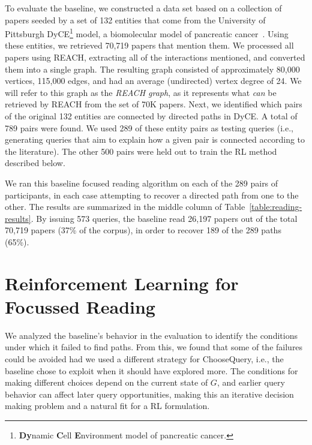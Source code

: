

To evaluate the baseline, we constructed a data set based on a collection of papers seeded by a set of 132 entities that come from the University of Pittsburgh DyCE\footnote{{\bf Dy}namic {\bf C}ell {\bf E}nvironment model of pancreatic cancer.} model, a biomolecular model of pancreatic cancer~\cite{dyce-inprep}.  Using these entities, we retrieved 70,719 papers that mention them.  We processed all papers using REACH, extracting all of the interactions mentioned, and converted them into a single graph.
The resulting graph consisted of approximately 80,000 vertices, 115,000 edges, and had an average (undirected) vertex degree of 24.  We will refer to this graph as the {\em REACH graph}, as it represents what {\em can} be retrieved by REACH from the set of 70K papers.  Next, we identified which pairs of the original 132 entities are connected by directed paths in DyCE.  A total of 789 pairs were found.  We used 289 of these entity pairs as testing queries (i.e., generating queries that aim to explain how a given pair is connected according to the literature). The other 500 pairs were held out to train the RL method described below.

We ran this baseline focused reading algorithm on each of the 289 pairs of participants, in each case attempting to recover a directed path from one to the other.  The results are summarized in the middle column of Table~\ref{table:reading-results}.  By issuing 573 queries, the baseline read 26,197 papers out of the total 70,719 papers (37\% of the corpus), in order to recover 189 of the 289 paths (65\%).

\section{Reinforcement Learning for Focussed Reading}\label{sec:rl}

We analyzed the baseline's behavior in the evaluation to identify the conditions under which it failed to find paths.  From this, we found that some of the failures could be avoided had we used a different strategy for {\sc ChooseQuery}, i.e., the baseline chose to exploit when it should have explored more.  The conditions for making different choices depend on the current state of $G$, and earlier query behavior can affect later query opportunities, making this an iterative decision making problem and a natural fit for a RL formulation.

